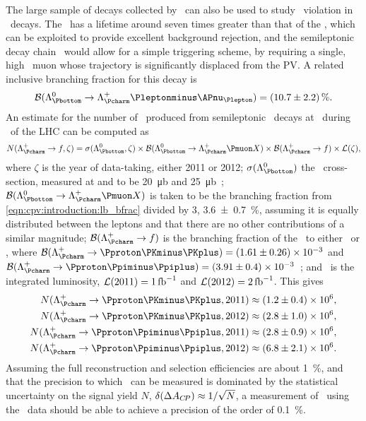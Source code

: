 The large sample of \PB decays collected by \lhcb\ can also be used to study 
\CP\ violation in \PLambdac\ decays.
The \PLambdab\ has a lifetime around seven times greater than that of the 
\PLambdac, which can be exploited to provide excellent background rejection, 
and the semileptonic decay chain \LbToLcmuX\ would allow for a simple 
triggering scheme, by requiring a single, high \pT\ muon whose trajectory is 
significantly displaced from the \ac{PV}.
A related inclusive branching fraction for this decay is~\cite{PDG2014}
\begin{equation}
  \bfrac(\decay{\PLambdab}{\PLambdac\Pleptonminus\APnu_{\Plepton}}) =
    \SI{10.7 \pm 2.2}{\percent}.
  \label{eqn:cpv:introduction:lb_bfrac}
\end{equation}
An estimate for the number of \LcTophh\ produced from semileptonic \PLambdab\ 
decays at \lhcb\ during \runone\ of the \ac{LHC} can be computed as
\begin{equation}
  N(\LcTof, \zeta) =
    \xsec(\PLambdab, \zeta)\times
    \bfrac(\LbToLcmuX)\times
    \bfrac(\LcTof)\times
    \lumi(\zeta),
\end{equation}
where $\zeta$ is the year of data-taking, either 2011 or 2012; 
$\xsec(\PLambdab)$ the \PLambdab\ cross-section, measured at  and 
\sqrtseq{8} to be \SI{20}{\micro\barn} and 
\SI{25}{\micro\barn}~\cite{Aaij:2015fea}; $\bfrac(\LbToLcmuX)$ is taken to be 
the branching fraction from \cref{eqn:cpv:introduction:lb_bfrac} divided by 3, 
\SI{3.6 \pm 0.7}{\percent},
assuming it is equally distributed between the leptons and that there are no 
other contributions of a similar magnitude; $\bfrac(\LcTof)$ is the branching 
fraction of the \PLambdac\ to either \pKK\ or \ppipi, where $\bfrac(\LcTopKK) = 
(1.61 \pm 0.26)\times 10^{-3}$ and $\bfrac(\LcToppipi) = (3.91 \pm 0.4)\times 
10^{-3}$~\cite{Ablikim:2016tze}; and \lumi\ is the integrated luminosity, 
$\lumi(2011) = \SI{1}{\per\femto\barn}$ and $\lumi(2012) = 
\SI{2}{\per\femto\barn}$.
This gives
\begin{align}
  N(\LcTopKK, 2011) &\approx (1.2 \pm 0.4) \times 10^{6},\nonumber\\
  N(\LcTopKK, 2012) &\approx (2.8 \pm 1.0) \times 10^{6},\nonumber\\
  N(\LcToppipi, 2011) &\approx (2.8 \pm 0.9) \times 10^{6},\nonumber\\
  N(\LcToppipi, 2012) &\approx (6.8 \pm 2.1) \times 10^{6}.
\end{align}
Assuming the full reconstruction and selection efficiencies are about 
\SI{1}{\percent}, and that the precision to which \dACP\ can be measured is 
dominated by the statistical uncertainty on the signal yield $N$, $\delta(\Delta A_{C\!P}) 
\approx 1/\sqrt{N}$, a measurement of \dACP\ using the \runone\ data should be 
able to achieve a precision of the order of \SI{0.1}{\percent}.

